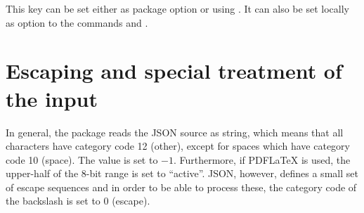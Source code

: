 \documentclass[a4paper]{article}
\begin{document}
This key can be set either as package option or using \macro{\JSONParseSet}. It can also be set locally as option to the commands \macro{\JSONParse} and \macro{\JSONParseFromFile}.

\section{Escaping and special treatment of the input}\label{sec:escaping}

In general, the package reads the JSON source as string, which means that all characters have category code 12 (other), except for spaces which have category code 10 (space). The \macro{\endlinechar} value is set to $-1$. Furthermore, if PDFLaTeX is used, the upper-half of the 8-bit range is set to ``active''. JSON, however, defines a small set of escape sequences and in order to be able to process these, the category code of the backslash is set to 0 (escape). 
\end{document}
